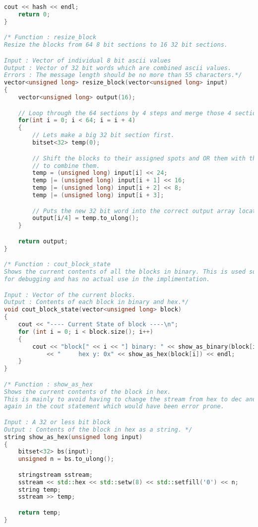 \begin{lstlisting}[language = C++]
	cout << hash << endl;
	return 0;
}

/* Function : resize_block
Resize the blocks from 64 8 bit sections to 16 32 bit sections.

Input : Vector of individual 8 bit ascii values
Output : Vector of 32 bit words which are combined ascii values.
Errors : The message length should be no more than 55 characters.*/
vector<unsigned long> resize_block(vector<unsigned long> input)
{
	vector<unsigned long> output(16);

	// Loop through the 64 sections by 4 steps and merge those 4 sections.
	for(int i = 0; i < 64; i = i + 4)
	{
		// Lets make a big 32 bit section first.
		bitset<32> temp(0);

		// Shift the blocks to their assigned spots and OR them with the original
		// to combine them.
		temp = (unsigned long) input[i] << 24;
		temp |= (unsigned long) input[i + 1] << 16;
		temp |= (unsigned long) input[i + 2] << 8;
		temp |= (unsigned long) input[i + 3];

		// Puts the new 32 bit word into the correct output array location.
		output[i/4] = temp.to_ulong();
	}

	return output;
}

/* Function : cout_block_state
Shows the current contents of all the blocks in binary. This is used solely
for debugging and has no actual use in the implimentation.

Input : Vector of the current blocks.
Output : Contents of each block in binary and hex.*/
void cout_block_state(vector<unsigned long> block)
{
	cout << "---- Current State of block ----\n"; 
	for (int i = 0; i < block.size(); i++)
	{
		cout << "block[" << i << "] binary: " << show_as_binary(block[i])
			<< "     hex y: 0x" << show_as_hex(block[i]) << endl;
	}
}

/* Function : show_as_hex
Shows the current contents of the block in hex.
This is mainly to avoid having to change the stream from hex to dec and back
again in the cout statement which would have been error prone.

Input : A 32 or less bit block
Output : Contents of the block in hex as a string. */
string show_as_hex(unsigned long input)
{
	bitset<32> bs(input);
	unsigned n = bs.to_ulong();

	stringstream sstream;
	sstream << std::hex << std::setw(8) << std::setfill('0') << n;
	string temp;
	sstream >> temp;

	return temp;
}




\end{lstlisting}
